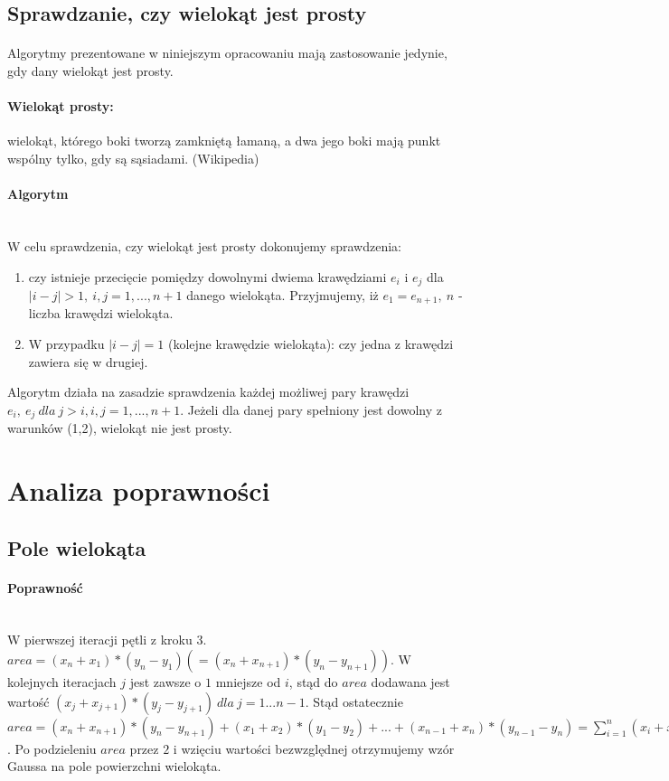 \documentclass{article}
\begin{document}
\subsection{Sprawdzanie, czy wielokąt jest prosty}
\paragraph{}Algorytmy prezentowane w niniejszym opracowaniu mają zastosowanie jedynie, gdy dany wielokąt jest prosty.
\paragraph{Wielokąt prosty:} wielokąt, którego boki tworzą zamkniętą łamaną, a dwa jego boki mają punkt wspólny tylko, gdy są sąsiadami. (Wikipedia)
\paragraph{Algorytm}\mbox{}\\
W celu sprawdzenia, czy wielokąt jest prosty dokonujemy sprawdzenia:
\begin{enumerate}
\item czy istnieje przecięcie pomiędzy dowolnymi dwiema krawędziami $e_i$ i $e_j$ dla $|i-j|>1,\ i,j=1,...,n+1$ danego wielokąta. Przyjmujemy, iż $e_1 = e_{n+1},\ n$ - liczba krawędzi wielokąta. 
\item W przypadku $|i-j|=1$ (kolejne krawędzie wielokąta): czy jedna z krawędzi zawiera się w drugiej.
\end{enumerate}
Algorytm działa na zasadzie sprawdzenia każdej możliwej pary krawędzi $e_i,\ e_j\ dla\ j>i, i,j=1,...,n+1$. Jeżeli dla danej pary spełniony jest dowolny z warunków (1,2), wielokąt nie jest prosty.



\section{Analiza poprawności}

\subsection{Pole wielokąta}
\paragraph{Poprawność} \mbox{}\\
W pierwszej iteracji pętli z kroku 3. \(area = (x_n+x_1)*(y_n-y_1) (=(x_n+x_{n+1})*(y_n-y_{n+1}))\). W kolejnych iteracjach \(j\) jest zawsze o \(1\) mniejsze od \(i\), stąd do \(area\) dodawana jest wartość \((x_j+x_{j+1})*(y_j-y_{j+1})\ dla\ j = 1...n-1\). Stąd ostatecznie \(area = (x_n+x_{n+1})*(y_n-y_{n+1}) + (x_1+x_2)*(y_1-y_2) + ... + (x_{n-1}+x_n)*(y_{n-1}-y_{n}) = \sum\limits_{i=1}^n (x_i+x_{i+1})*(y_{i+1}-y_i)\). Po podzieleniu \(area\) przez \(2\) i wzięciu wartości bezwzględnej otrzymujemy wzór Gaussa na pole powierzchni wielokąta.
\end{document}
